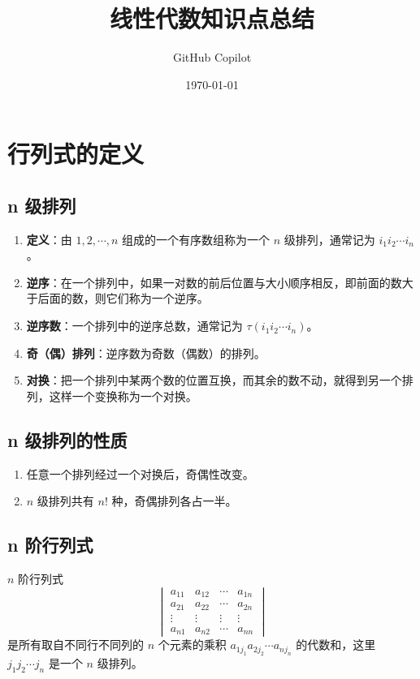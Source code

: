 \documentclass[UTF8]{ctexart}
\title{线性代数知识点总结}
\author{GitHub Copilot}
\date{\today}
\theoremstyle{mydef}
\begin{document}
\maketitle
\tableofcontents
\newpage

\section{行列式的定义}

\subsection{n 级排列}

\begin{enumerate}
    \item \textbf{定义}：由 $1, 2, \cdots, n$ 组成的一个有序数组称为一个 $n$ 级排列，通常记为 $i_1 i_2 \cdots i_n$。
    \item \textbf{逆序}：在一个排列中，如果一对数的前后位置与大小顺序相反，即前面的数大于后面的数，则它们称为一个逆序。
    \item \textbf{逆序数}：一个排列中的逆序总数，通常记为 $\tau(i_1 i_2 \cdots i_n)$。
    \item \textbf{奇（偶）排列}：逆序数为奇数（偶数）的排列。
    \item \textbf{对换}：把一个排列中某两个数的位置互换，而其余的数不动，就得到另一个排列，这样一个变换称为一个对换。
\end{enumerate}

\subsection{n 级排列的性质}

\begin{enumerate}
    \item 任意一个排列经过一个对换后，奇偶性改变。
    \item $n$ 级排列共有 $n!$ 种，奇偶排列各占一半。
\end{enumerate}

\subsection{n 阶行列式}

$n$ 阶行列式
$$
\begin{vmatrix}
a_{11} & a_{12} & \cdots & a_{1n} \\
a_{21} & a_{22} & \cdots & a_{2n} \\
\vdots & \vdots & \vdots & \vdots \\
a_{n1} & a_{n2} & \cdots & a_{nn}
\end{vmatrix}
$$
是所有取自不同行不同列的 $n$ 个元素的乘积 $a_{1j_1} a_{2j_2} \cdots a_{nj_n}$ 的代数和，这里 $j_1 j_2 \cdots j_n$ 是一个 $n$ 级排列。
\end{document}
